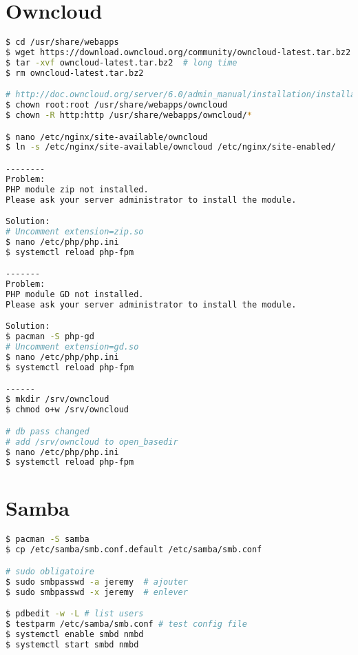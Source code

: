 \section{Owncloud}
\begin{lstlisting}[language=bash,caption=Owncloud setup]
$ cd /usr/share/webapps
$ wget https://download.owncloud.org/community/owncloud-latest.tar.bz2
$ tar -xvf owncloud-latest.tar.bz2  # long time
$ rm owncloud-latest.tar.bz2 

# http://doc.owncloud.org/server/6.0/admin_manual/installation/installation_source.html#set-the-directory-permissions
$ chown root:root /usr/share/webapps/owncloud
$ chown -R http:http /usr/share/webapps/owncloud/*

$ nano /etc/nginx/site-available/owncloud
$ ln -s /etc/nginx/site-available/owncloud /etc/nginx/site-enabled/

--------
Problem: 
PHP module zip not installed.
Please ask your server administrator to install the module.

Solution:
# Uncomment extension=zip.so
$ nano /etc/php/php.ini 
$ systemctl reload php-fpm

-------
Problem:
PHP module GD not installed.
Please ask your server administrator to install the module.

Solution:
$ pacman -S php-gd
# Uncomment extension=gd.so
$ nano /etc/php/php.ini 
$ systemctl reload php-fpm

------
$ mkdir /srv/owncloud
$ chmod o+w /srv/owncloud

# db pass changed
# add /srv/owncloud to open_basedir
$ nano /etc/php/php.ini
$ systemctl reload php-fpm
\end{lstlisting}

\section{Samba}
\begin{lstlisting}[language=bash,caption=Samba setup]
$ pacman -S samba
$ cp /etc/samba/smb.conf.default /etc/samba/smb.conf

# sudo obligatoire
$ sudo smbpasswd -a jeremy  # ajouter
$ sudo smbpasswd -x jeremy  # enlever

$ pdbedit -w -L # list users
$ testparm /etc/samba/smb.conf # test config file
$ systemctl enable smbd nmbd
$ systemctl start smbd nmbd
\end{lstlisting}

